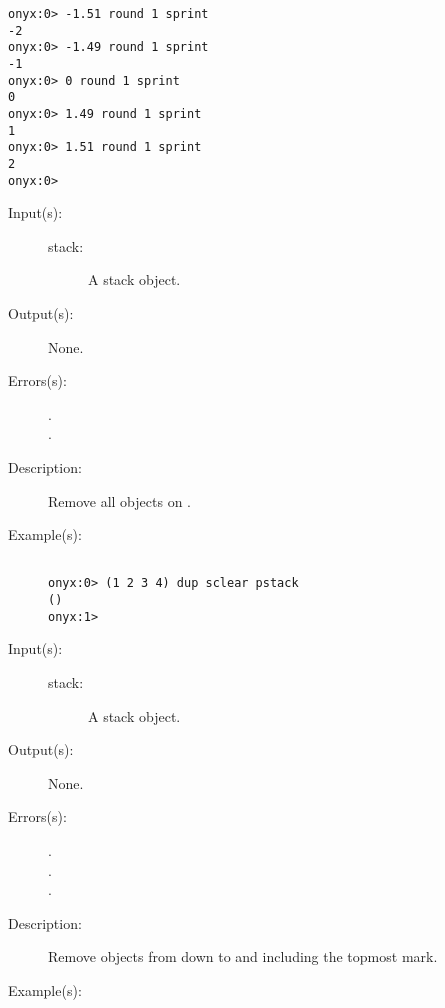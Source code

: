 \begin{description}
\begin{description}
\begin{verbatim}
onyx:0> -1.51 round 1 sprint
-2
onyx:0> -1.49 round 1 sprint
-1
onyx:0> 0 round 1 sprint
0
onyx:0> 1.49 round 1 sprint
1
onyx:0> 1.51 round 1 sprint
2
onyx:0>
		\end{verbatim}
	\end{description}
\label{systemdict:sclear}
\item[{\onyxop{stack}{sclear}{--}}: ]
	\begin{description}\item[]
	\item[Input(s): ]
		\begin{description}\item[]
		\item[stack: ]
			A stack object.
		\end{description}
	\item[Output(s): ] None.
	\item[Errors(s): ]
		\begin{description}\item[]
		\item[.]
		\item[.]
		\end{description}
	\item[Description: ]
		Remove all objects on .
	\item[Example(s): ]\begin{verbatim}

onyx:0> (1 2 3 4) dup sclear pstack
()
onyx:1>
		\end{verbatim}
	\end{description}
\label{systemdict:scleartomark}
\item[{\onyxop{stack}{scleartomark}{--}}: ]
	\begin{description}\item[]
	\item[Input(s): ]
		\begin{description}\item[]
		\item[stack: ]
			A stack object.
		\end{description}
	\item[Output(s): ] None.
	\item[Errors(s): ]
		\begin{description}\item[]
		\item[.]
		\item[.]
		\item[.]
		\end{description}
	\item[Description: ]
		Remove objects from  down to and including the
		topmost mark.
	\item[Example(s): ]\begin{verbatim}


\end{verbatim}
\end{description}
\end{description}
